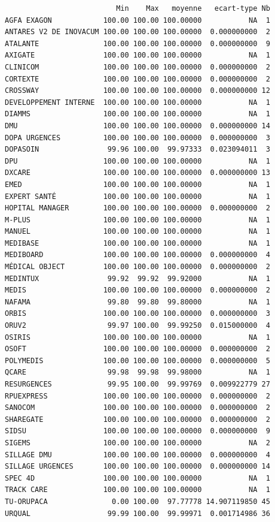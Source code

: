 \documentclass[]{article}
\begin{document}
\begin{verbatim}
                          Min    Max   moyenne   ecart-type Nb
AGFA EXAGON            100.00 100.00 100.00000           NA  1
ANTARES V2 DE INOVACUM 100.00 100.00 100.00000  0.000000000  2
ATALANTE               100.00 100.00 100.00000  0.000000000  9
AXIGATE                100.00 100.00 100.00000           NA  1
CLINICOM               100.00 100.00 100.00000  0.000000000  2
CORTEXTE               100.00 100.00 100.00000  0.000000000  2
CROSSWAY               100.00 100.00 100.00000  0.000000000 12
DEVELOPPEMENT INTERNE  100.00 100.00 100.00000           NA  1
DIAMMS                 100.00 100.00 100.00000           NA  1
DMU                    100.00 100.00 100.00000  0.000000000 14
DOPA URGENCES          100.00 100.00 100.00000  0.000000000  3
DOPASOIN                99.96 100.00  99.97333  0.023094011  3
DPU                    100.00 100.00 100.00000           NA  1
DXCARE                 100.00 100.00 100.00000  0.000000000 13
EMED                   100.00 100.00 100.00000           NA  1
EXPERT SANTÉ           100.00 100.00 100.00000           NA  1
HOPITAL MANAGER        100.00 100.00 100.00000  0.000000000  2
M-PLUS                 100.00 100.00 100.00000           NA  1
MANUEL                 100.00 100.00 100.00000           NA  1
MEDIBASE               100.00 100.00 100.00000           NA  1
MEDIBOARD              100.00 100.00 100.00000  0.000000000  4
MÉDICAL OBJECT         100.00 100.00 100.00000  0.000000000  2
MEDINTUX                99.92  99.92  99.92000           NA  1
MEDIS                  100.00 100.00 100.00000  0.000000000  2
NAFAMA                  99.80  99.80  99.80000           NA  1
ORBIS                  100.00 100.00 100.00000  0.000000000  3
ORUV2                   99.97 100.00  99.99250  0.015000000  4
OSIRIS                 100.00 100.00 100.00000           NA  1
OSOFT                  100.00 100.00 100.00000  0.000000000  2
POLYMEDIS              100.00 100.00 100.00000  0.000000000  5
QCARE                   99.98  99.98  99.98000           NA  1
RESURGENCES             99.95 100.00  99.99769  0.009922779 27
RPUEXPRESS             100.00 100.00 100.00000  0.000000000  2
SANOCOM                100.00 100.00 100.00000  0.000000000  2
SHAREGATE              100.00 100.00 100.00000  0.000000000  2
SIDSU                  100.00 100.00 100.00000  0.000000000  9
SIGEMS                 100.00 100.00 100.00000           NA  2
SILLAGE DMU            100.00 100.00 100.00000  0.000000000  4
SILLAGE URGENCES       100.00 100.00 100.00000  0.000000000 14
SPEC 4D                100.00 100.00 100.00000           NA  1
TRACK CARE             100.00 100.00 100.00000           NA  1
TU-ORUPACA               0.00 100.00  97.77778 14.907119850 45
URQUAL                  99.99 100.00  99.99971  0.001714986 36
\end{verbatim}
\end{document}
